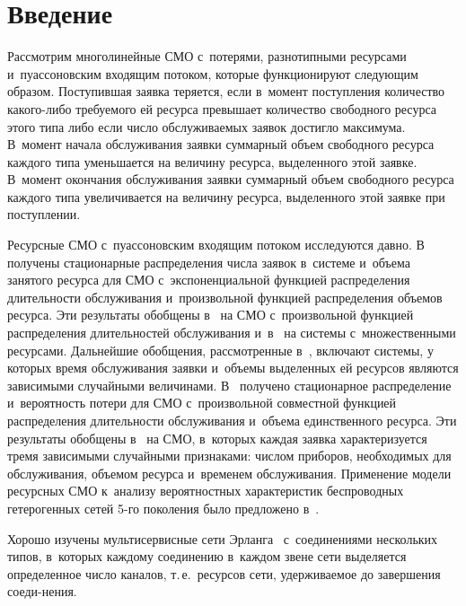 \thispagestyle{headings}

\begin{multicols}{2}

\label{st\stat}

\section{Введение}

  Рассмотрим многолинейные СМО с~потерями, разнотипными ресурсами 
и~пуассоновским входящим потоком, которые функционируют сле\-ду\-ющим 
образом. Поступившая заявка теряется, если в~момент поступления количество 
ка\-ко\-го-ли\-бо требуемого ей ресурса превышает количество свободного 
ресурса этого типа либо если число обслуживаемых заявок достигло 
максимума. В~момент начала обслуживания заявки суммарный объем 
свободного ресурса каждого типа уменьшается на величину ресурса, 
выделенного этой заявке. В~момент окончания обслуживания заявки 
суммарный объем свободного ресурса каждого типа увеличивается на величину 
ресурса, выделенного этой заявке при поступлении. 
  
  Ресурсные СМО с~пуассоновским входящим потоком исследуются давно. 
В~\cite{3-n} получены стационарные распределения числа заявок в~системе 
и~объема занятого ресурса для СМО с~экспоненциальной функцией 
распределения длительности обслуживания и~произвольной функцией 
распределения объемов ресурса. Эти результаты обобщены в~\cite{4-n} на 
СМО с~произвольной функцией распределения длительностей обслуживания 
и~в~\cite{1-n} на системы с~множественными ресурсами. Дальнейшие 
обобщения, рассмотренные в~\cite{5-n, 6-n}, включают системы, у которых 
время обслуживания заявки и~объемы выделенных ей ресурсов являются 
зависимыми случайными величинами. В~\cite{5-n} получено стационарное 
распределение и~вероятность потери для СМО с~произвольной совместной 
функцией распределения длительности обслуживания и~объема единственного 
ресурса. Эти результаты обобщены в~\cite{6-n} на СМО, в~которых каждая 
заявка характеризуется тремя зависимыми случайными признаками: числом 
приборов, необходимых для обслуживания, объемом ресурса и~временем 
обслуживания. Применение модели ресурсных СМО к~анализу вероятностных 
характеристик беспроводных гетерогенных сетей 5-го поколения было 
предложено в~\cite{2-n}.
  
  Хорошо изучены мультисервисные сети Эрланга~\cite{7-n, 8-n} 
с~соединениями нескольких типов, в~которых каждому соединению в~каждом 
звене сети выделяется определенное число каналов, т.\,е.\ ресурсов сети, 
удерживаемое до завершения соеди-\linebreak нения. 


\end{multicols}

